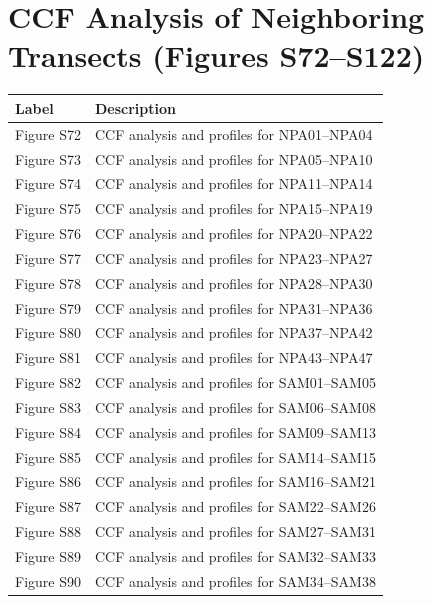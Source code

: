 \documentclass[final]{agujournal2019}
\newcounter{none}
\begin{document}
\clearpage

\section*{CCF Analysis of Neighboring Transects (Figures
S72--S122)}\label{sec:ccf-analysis-of-neighboring-transects}

{\def\LTcaptype{none} %
\begin{longtable}[]{@{}ll@{}}
\toprule\noalign{}
Label & Description \\
\midrule\noalign{}
\endhead
\bottomrule\noalign{}
\endlastfoot
Figure S72 & CCF analysis and profiles for NPA01--NPA04 \\
Figure S73 & CCF analysis and profiles for NPA05--NPA10 \\
Figure S74 & CCF analysis and profiles for NPA11--NPA14 \\
Figure S75 & CCF analysis and profiles for NPA15--NPA19 \\
Figure S76 & CCF analysis and profiles for NPA20--NPA22 \\
Figure S77 & CCF analysis and profiles for NPA23--NPA27 \\
Figure S78 & CCF analysis and profiles for NPA28--NPA30 \\
Figure S79 & CCF analysis and profiles for NPA31--NPA36 \\
Figure S80 & CCF analysis and profiles for NPA37--NPA42 \\
Figure S81 & CCF analysis and profiles for NPA43--NPA47 \\
Figure S82 & CCF analysis and profiles for SAM01--SAM05 \\
Figure S83 & CCF analysis and profiles for SAM06--SAM08 \\
Figure S84 & CCF analysis and profiles for SAM09--SAM13 \\
Figure S85 & CCF analysis and profiles for SAM14--SAM15 \\
Figure S86 & CCF analysis and profiles for SAM16--SAM21 \\
Figure S87 & CCF analysis and profiles for SAM22--SAM26 \\
Figure S88 & CCF analysis and profiles for SAM27--SAM31 \\
Figure S89 & CCF analysis and profiles for SAM32--SAM33 \\
Figure S90 & CCF analysis and profiles for SAM34--SAM38 \\

\end{longtable}}
\end{document}
